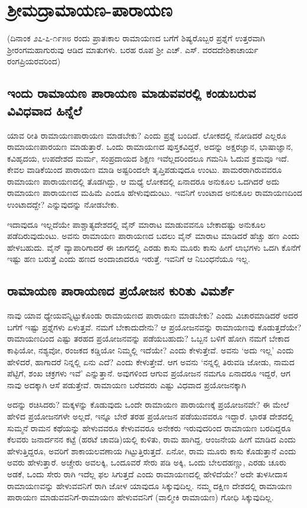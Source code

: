 \chapter{ಶ್ರೀಮದ್ರಾಮಾಯಣ-ಪಾರಾಯಣ} 

(ದಿನಾಂಕ ೨೭-೭-೧೯೫೮ ರಂದು ಪ್ರಾತಃಕಾಲ ರಾಮಾಯಣದ ಬಗೆಗೆ ಶಿಷ್ಯರೊಬ್ಬರ ಪ್ರಶ್ನೆಗೆ ಉತ್ತರವಾಗಿ ಶ್ರೀರಂಗಮಹಾಗುರುವು ಆಡಿದ ಮಾತುಗಳು. ಬರಹ ರೂಪ ಶ್ರೀ ಎಚ್‍. ಎಸ್‍. ವರದದೇಶಿಕಾಚಾರ್ಯ ರಂಗಪ್ರಿಯರವರಿಂದ) 

\section*{ಇಂದು ರಾಮಾಯಣ ಪಾರಾಯಣ ಮಾಡುವವರಲ್ಲಿ ಕಂಡುಬರುವ ವಿವಿಧವಾದ ಹಿನ್ನೆಲೆ} 


ಯಾವ ರೀತಿ ರಾಮಾಯಣಪಾರಾಯಣ ಮಾಡಬೇಕು? ಎಂದು ಪ್ರಶ್ನೆ ಬಂದಿದೆ. ಲೋಕದಲ್ಲಿ ನೋಡಿದರೆ ಎಲ್ಲರೂ ರಾಮಾಯಣಪಾರಯಣ ಮಾಡುತ್ತಾರೆ. ಒಂದು ರಾಮಾಯಣದ ಪುಸ್ತಕವಿದ್ದರೆ, ಅದನ್ನು ಅಕ್ಷರಜ್ಞಾನ, ಭಾಷಾಜ್ಞಾನ, ಕವಿಹೃದಯ, ಉಪದೇಶದ ಮರ್ಮ, ಸಂಪ್ರದಾಯದ ಶಿಕ್ಷಣ ಇವೆಲ್ಲದರಿಂದಲೂ ಗಮನಿಸಿ ಓದುವ ಕ್ರಮವೂ ಇದೆ. ಕೇವಲ ವಾಡಿಕೆಯಿಂದ ಪಾರಾಯಣ ಮಾಡಿ ಅಷ್ಟರಿಂದಲೇ ತೃಪ್ತಿಪಡುವುದೂ ಉಂಟು. ಪಾಮರರಾಗಿರುವವರೂ ರಾಮಾಯಣ ಪಾರಾಯಣದಲ್ಲಿ ತೊಡಗಿದ್ದು, ಆ ಮಧ್ಯೆ ಲೋಕದಲ್ಲಿ ಏನಾದರೂ ಅನುಕೂಲ ಒದಗಿದರೆ ಅದು ರಾಮಾಯಣ ಪಾರಾಯಣದ ಮಹಿಮೆ ಎಂದೂ ಹೇಳುವುದುಂಟು. ಇವನಿಗೆ ಉಂಟಾದ ಅನುಕೂಲ ರಾಮಾಯಣದಿಂದ ಉಂಟಾದದ್ದೇ? ಎನ್ನುವುದನ್ನು ನೋಡಬೇಕು. 


ಇದಾವುದೂ ಇಲ್ಲದೆಯೇ ಪಾಶ್ಚಾತ್ಯದೇಶದಲ್ಲಿ ವೈನ್‍ ಮಾರಾಟ ಮಾಡುವವನೂ ಬೇಕಾದಷ್ಟು ಅನುಕೂಲ ಪಡೆದಿರುವುದುಂಟು. ಅವನು ರಾಮಾಯಣ ಪಾರಾಯಣದ ಬದಲು ವೈನ್‍ ಮಾರಾಟ ಮಾಡಿದರೆ ಹೆಚ್ಚು ಹಣ ಎಂದು ಹೇಳಬಹುದು. ವೈನ್‍ ವ್ಯಾಪಾರಿಗಾದರೆ ಈ ಜಾಗದಲ್ಲಿ ಎರಡು ಕಾಸು ಮೂರು ಕಾಸು ಹೀಗೆ ಲಾಭಗಳು ಒದಗಿ ಕೊನೆಗೆ ಇಷ್ಟು ಹಣ ಬರುತ್ತೆ ಎಂದು ಹಣದ ಅಂದಾಜಾದರೂ ಇರುತ್ತೆ. ಇವನಿಗೆ ಆ ನಿಬಂಧನೆಯೂ ಇಲ್ಲ. 


\section*{ರಾಮಾಯಣ ಪಾರಾಯಣದ ಪ್ರಯೋಜನ ಕುರಿತು ವಿಮರ್ಶೆ} 


ನಾವು ಯಾವ ಧ್ಯೇಯವನ್ನಿಟ್ಟುಕೊಂಡು ರಾಮಾಯಣದ ಪಾರಾಯಣ ಮಾಡಬೇಕು? ಎಂದು ವಿಚಾರಮಾಡಿದರೆ ಅದರ ಬಗೆಗೆ ಇಷ್ಟು ಪ್ರಶ್ನೆಗಳು ಏಳುತ್ತವೆ. ನಮಗೆ ಬೇಕಾದುದೇನು? ಆ ಪ್ರಯೋಜನವನ್ನು ರಾಮಾಯಣವು ಕೊಡುತ್ತದೆಯೇ? ರಾಮಾಯಣದಿಂದ ಎಷ್ಟು ತರಹದ ಪ್ರಯೋಜನವನ್ನು ಪಡೆಯಬಹುದು? ಒಬ್ಬನ ಬಳಿಗೆ ಹೋಗಿ ನಮಗೆ ಬೇಕಾದ ಕಾಫಿಯೋ, ನಶ್ಯವೋ, ರಂಜಕದ ಕಡ್ಡಿಯೋ ನಿಮ್ಮಲ್ಲಿ ಇದೆಯೇ? ಎಂದು ಕೇಳುತ್ತೇವೆ. ಅವನು `ಅದು ಇಲ್ಲ' ಎಂದು ಹೇಳಿದರೆ, ಹಾಗಾದರೆ ನಿನ್ನಲ್ಲಿ ಏನು ಎದೆ? ಎಂದು ಕೇಳುತ್ತೇವೆ. ಆಗ ಅವನು `ನನ್ನಲ್ಲಿ ತಿರುವಡಿ ಜೋಡು, ನಾಮದ ಪೆಟ್ಟಿಗೆ, ಶಂಖ ಚಕ್ರಗಳು ಇವೆ' ಎನ್ನುತ್ತಾನೆ. ಅವುಗಳಿಂದ ಆಗುವ ಪ್ರಯೋಜನ ನಮಗೂ ಏನಾದರೂ ಇದ್ದರೆ, ಆಗ ನಾವು ಅದಕ್ಕಾಗಿ ಆಸೆ ಪಡುತ್ತೇವೆ. ರಾಮಾಯಣ ಬರೆದವರು ಎಷ್ಟು ವಿಧವಾದ ಪ್ರಯೋಜನಕ್ಕಾಗಿ 

ಅದನ್ನು ರಚಿಸಿದರು? ಮಕ್ಕಳನ್ನು ಕೊಡುವುದು ಒಂದೇ ರಾಮಾಯಣ ಪಾರಾಯಣಕ್ಕೆ ಪ್ರಯೋಜನವೇ? ಈ ಮೇಲೆ ಹೇಳಿದ ಪ್ರಯೋಜನಗಳೇ ಅಲ್ಲದೆ, ಇನ್ನೂ ಬೇರೆ ತರಹ ಪ್ರಯೋಜನ ಪಡೆಯುವವರೂ ಇದ್ದಾರೆ. ಭಾರತ ದೇಶದಲ್ಲಿ ಸುಮ್ಮನೆ ರಾಮನ ಕಥೆಯನ್ನು ಹೇಳುವವರೂ ಕೇಳುವವರೂ ಅನೇಕರು ಇರುವುದರಿಂದ ರಾಮಾಯಣ ಬರದಿದ್ದರೂ ಕೆಲವರು ಜನಾರ್ದನನ ಕಟ್ಟೆ (ಹರಟೆ ಚಾವಡಿ)ಯಲ್ಲಿ ಕುಳಿತು, ರಾಮ ಹಾಗಿದ್ದ, ಆಂಜನೇಯ ಹೀಗೆ ಮಾಡಿದ ಎಂದು ಹೇಳುತ್ತಿದ್ದರೂ, ಅವರಿಗೆ ಶಾಕಾಯಲವಣಾಯ ಗಿಟ್ಟುತ್ತಿರುತ್ತದೆ. ಏನೋ, ರಾಮ ಮೂರು ಕಾಸು ಕೊಡುತ್ತಾನೆ ಎಂದು ಅವರು ಹೇಳುತ್ತಾರೆ. ಅಚ್ಚೇರು ಅವಲಕ್ಕಿ, ಒಂದೂವರೆ ಸೇರು ಪಡಿ ಅಕ್ಕಿ, ಒಂದು ಬೇಲದಹಣ್ಣು, ಎರಡು ಚೂರು ಅಡಕೆ, ಒಂದು ಸೇರು ರಾಗಿ ಇದೆಲ್ಲ ಫಲ ಸಿಗುತ್ತದೆ ಎಂದು ರಾಮಾಯಣದಲ್ಲಿ ಹೇಳಿದೆಯೇ? ಅದೇ ತುಳಸೀದಾಸ ರಾಮಾಯಣವನ್ನು ಹೇಳುವವನಿಗೆ ರಾಗಿ ಜೋಳ ಯಾವುದೂ ಸಿಕ್ಕುವುದಿಲ್ಲ. ನಮ್ಮ ದಕ್ಷಿಣ ದೇಶದಲ್ಲಿ ರಾಮಾಯಣ ಪಾರಾಯಣ ಮಾಡುವವನಿಗೆ-ರಾಮಾಯಣ ಹೇಳುವವನಿಗೆ (ವಾಲ್ಮೀಕಿ ರಾಮಾಯಣ) ಗೋಧಿ ಸಿಕ್ಕುವುದಿಲ್ಲ. 

